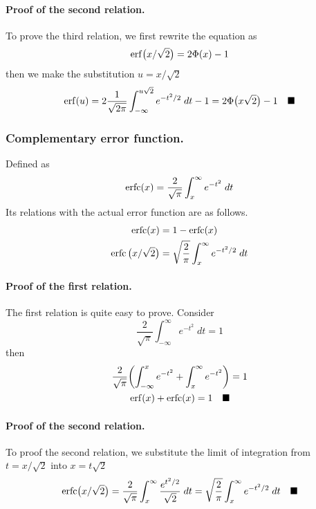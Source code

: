 \documentclass[../../main.tex]{subfiles}
\begin{document}
\paragraph{Proof of the second relation.} To prove the third relation, we first rewrite the equation as
\begin{align*}
    \operatorname{erf}\bigl(x/\sqrt{2}\bigr)= 2\Phi(x)-1
\end{align*}
then we make the substitution $u=x/\sqrt{2}$
\begin{align*}
    \operatorname{erf}(u)= 2\frac{1}{\sqrt{2\pi}}\int_{-\infty}^{u\sqrt{2}} e^{-t^2/2}\;dt-1=2\Phi\bigl(x\sqrt{2}\bigr)-1\quad\blacksquare
\end{align*}

\subsubsection{Complementary error function.} Defined as 
\begin{equation*}
    \operatorname{erfc}(x)=\frac{2}{\sqrt{\pi}}\int_{x}^{\infty}e^{-t^2}\;dt
\end{equation*}
Its relations with the actual error function are as follows.
\begin{align*}
    \operatorname{erfc}(x)&=1-\operatorname{erfc}(x)\\
    \operatorname{erfc}\big(x/\sqrt{2}\big)&=\sqrt{\frac{2}{\pi}}\int_{x}^{\infty}e^{-t^2/2}\;dt
\end{align*}

\paragraph{Proof of the first relation.} The first relation is quite easy to prove. Consider
\begin{equation*}
    \frac{2}{\sqrt{\pi}}\int_{-\infty}^{\infty}e^{-t^2}\;dt=1
\end{equation*}
then
\begin{align*}
    \frac{2}{\sqrt{\pi}}\biggl(\int_{-\infty}^{x}e^{-t^2}+\int_{x}^{\infty}e^{-t^2}\biggr)&=1\\
    \operatorname{erf}(x)+\operatorname{erfc}(x)=1\quad\blacksquare
\end{align*}

\paragraph{Proof of the second relation.} To proof the second relation, we substitute the limit of integration from $t=x/\sqrt{2}$ into $x=t\sqrt{2}$
\begin{align*}
    \operatorname{erfc}\bigl(x/\sqrt{2}\bigr)=\frac{2}{\sqrt{\pi}}\int_{x}^{\infty}\frac{e^{t^2/2}}{\sqrt{2}}\;dt=\sqrt{\frac{2}{\pi}}\int_{x}^{\infty}e^{-t^2/2}\;dt\quad\blacksquare
\end{align*}
\end{document}
